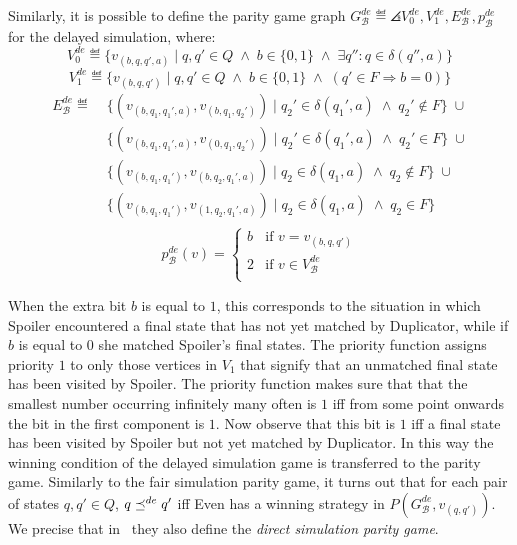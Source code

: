 Similarly, it is possible to define the parity game graph
$G_{\mathcal{B}}^{de} \eqdef \angles{V_0^{de}, V_1^{de}, E_{\mathcal{B}}^{de}, p_{\mathcal{B}}^{de}}$
for the delayed simulation,
where:
\[V_0^{de}  \eqdef \{ v_{(b,q,q',a)} \;|\; q,q' \in Q \; \wedge \; b \in \{0,1\} \; \wedge \;
\exists q'': q \in \delta(q'',a) \} \]
\[ V_1^{de}  \eqdef \{ v_{(b,q,q')} \;|\; q,q' \in Q \; \wedge \; b \in \{0,1\}
\; \wedge \; (q' \in F \Longrightarrow b=0)\} \]
\begin{equation*}
\begin{split}
E_{\mathcal{B}}^{de} \eqdef \;
& \{(v_{(b,q_1,q_1',a)}, v_{(b,q_1,q_2')}) \;|\; q_2' \in \delta(q_1',a) \; \wedge \; q_2' \notin F \} \;\cup \\
& \{(v_{(b,q_1,q_1',a)}, v_{(0,q_1,q_2')}) \;|\; q_2' \in \delta(q_1',a) \; \wedge \; q_2' \in F \} \;\cup \\
& \{(v_{(b,q_1,q_1')}, v_{(b,q_2,q_1',a)}) \;|\; q_2 \in \delta(q_1,a) \; \wedge \; q_2 \notin F \} \;\cup \\
& \{(v_{(b,q_1,q_1')}, v_{(1,q_2,q_1',a)}) \;|\; q_2 \in \delta(q_1,a) \; \wedge \; q_2 \in F \} \\
\end{split}
\end{equation*}
\[p_{\mathcal{B}}^{de}(v) =
\begin{cases}
b &\mbox{if } v = v_{(b,q,q')}\\
2 &\mbox{if } v \in V_{\mathcal{B}}^{de}\\
\end{cases}\]

When the extra bit $b$ is equal to $1$, this corresponds to the situation in which
Spoiler encountered a final state that has not yet matched by Duplicator,
while if $b$ is equal to $0$ she matched Spoiler's final states.
The priority function assigns priority $1$ to only those vertices in $V_1$ that
signify that an unmatched final state has been visited by Spoiler.
The priority function makes sure that that the smallest number occurring infinitely
many often is $1$ iff from some point onwards the bit in the first component is $1$.
Now observe that this bit is $1$ iff a final state has been visited by Spoiler
but not yet matched by Duplicator.
In this way the winning condition of the delayed simulation game is transferred
to the parity game.
Similarly to the fair simulation parity game, it turns out that
for each pair of states $q,q' \in Q$, $q \preceq^{de} q'$ iff Even has a winning
strategy in $P(G_{\mathcal{B}}^{de}, v_{(q,q')})$.
We precise that in~\cite{etessami2005fair} they also define the
\emph{direct simulation parity game}.


